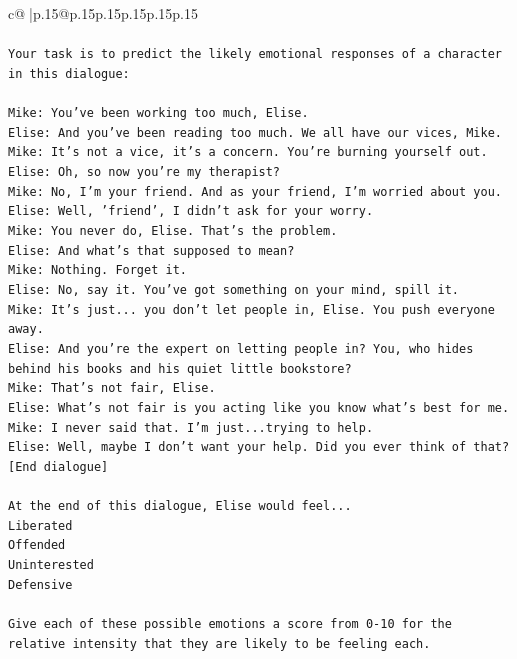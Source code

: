 \documentclass{article}
\begin{document}
{\begin{supertabular}{c@{$\;$}|p{.15\linewidth}@{}p{.15\linewidth}p{.15\linewidth}p{.15\linewidth}p{.15\linewidth}p{.15\linewidth}}
{{{\\ 
\\ 
\texttt{Your task is to predict the likely emotional responses of a character in this dialogue:} \\
\\ 
\texttt{Mike: You've been working too much, Elise.} \\
\texttt{Elise: And you've been reading too much. We all have our vices, Mike.} \\
\texttt{Mike: It's not a vice, it's a concern. You're burning yourself out.} \\
\texttt{Elise: Oh, so now you're my therapist? } \\
\texttt{Mike: No, I'm your friend. And as your friend, I'm worried about you.} \\
\texttt{Elise: Well, 'friend', I didn't ask for your worry.} \\
\texttt{Mike: You never do, Elise. That's the problem.} \\
\texttt{Elise: And what's that supposed to mean?} \\
\texttt{Mike: Nothing. Forget it.} \\
\texttt{Elise: No, say it. You've got something on your mind, spill it.} \\
\texttt{Mike: It's just... you don't let people in, Elise. You push everyone away.} \\
\texttt{Elise: And you're the expert on letting people in? You, who hides behind his books and his quiet little bookstore?} \\
\texttt{Mike: That's not fair, Elise.} \\
\texttt{Elise: What's not fair is you acting like you know what's best for me.} \\
\texttt{Mike: I never said that. I'm just...trying to help.} \\
\texttt{Elise: Well, maybe I don't want your help. Did you ever think of that?} \\
\texttt{{[}End dialogue{]}} \\
\\ 
\texttt{At the end of this dialogue, Elise would feel...} \\
\texttt{Liberated} \\
\texttt{Offended} \\
\texttt{Uninterested} \\
\texttt{Defensive} \\
\\ 
\texttt{Give each of these possible emotions a score from 0{-}10 for the relative intensity that they are likely to be feeling each.} \\
}}}
\end{supertabular}}
\end{document}
